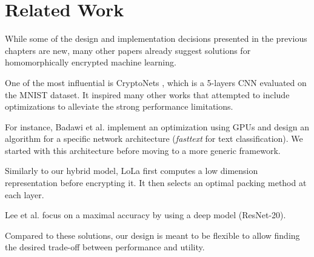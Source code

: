 \documentclass[a4paper,11pt,oneside]{report}
\begin{document}


\chapter{Related Work}


While some of the design and implementation decisions presented in the previous chapters are new, many other papers already suggest solutions for homomorphically encrypted machine learning.

One of the most influential is CryptoNets \cite{dowlin_cryptonets_2016}, which is a 5-layers CNN evaluated on the MNIST dataset. 
It inspired many other works that attempted to include optimizations to alleviate the strong performance limitations.

For instance, Badawi et al. \cite{badawi_privft_2020, badawi_towards_2020} implement an optimization using GPUs and design an algorithm for a specific network architecture (\emph{fasttext} for text classification). 
We started with this architecture before moving to a more generic framework.

Similarly to our hybrid model, LoLa \cite{brutzkus_low_2019} first computes a low dimension representation before encrypting it. 
It then selects an optimal packing method at each layer.

Lee et al. \cite{lee_privacy-preserving_2021} focus on a maximal accuracy by using a deep model (ResNet-20).

Compared to these solutions, our design is meant to be flexible to allow finding the desired trade-off between performance and utility.
\end{document}
